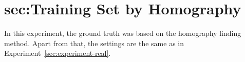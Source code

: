 \section{sec:Training Set by Homography}

In this experiment, the ground truth was based on the homography finding method. Apart from that, the settings are the same as in Experiment~\ref{sec:experiment-real}.